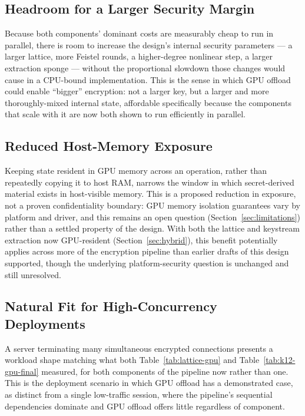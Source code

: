 \documentclass[twocolumn,10pt,journal,compsoc]{IEEEtran}
\begin{document}
\subsection{Headroom for a Larger Security Margin}
Because both components' dominant costs are measurably cheap to run in parallel, there is room to increase the design's internal security parameters --- a larger lattice, more Feistel rounds, a higher-degree nonlinear step, a larger extraction sponge --- without the proportional slowdown those changes would cause in a CPU-bound implementation. This is the sense in which GPU offload could enable ``bigger'' encryption: not a larger key, but a larger and more thoroughly-mixed internal state, affordable specifically because the components that scale with it are now both shown to run efficiently in parallel.

\subsection{Reduced Host-Memory Exposure}
Keeping state resident in GPU memory across an operation, rather than repeatedly copying it to host RAM, narrows the window in which secret-derived material exists in host-visible memory. This is a proposed reduction in exposure, not a proven confidentiality boundary: GPU memory isolation guarantees vary by platform and driver, and this remains an open question (Section~\ref{sec:limitations}) rather than a settled property of the design. With both the lattice and keystream extraction now GPU-resident (Section~\ref{sec:hybrid}), this benefit potentially applies across more of the encryption pipeline than earlier drafts of this design supported, though the underlying platform-security question is unchanged and still unresolved.

\subsection{Natural Fit for High-Concurrency Deployments}
A server terminating many simultaneous encrypted connections presents a workload shape matching what both Table~\ref{tab:lattice-gpu} and Table~\ref{tab:k12-gpu-final} measured, for both components of the pipeline now rather than one. This is the deployment scenario in which GPU offload has a demonstrated case, as distinct from a single low-traffic session, where the pipeline's sequential dependencies dominate and GPU offload offers little regardless of component.
\end{document}
